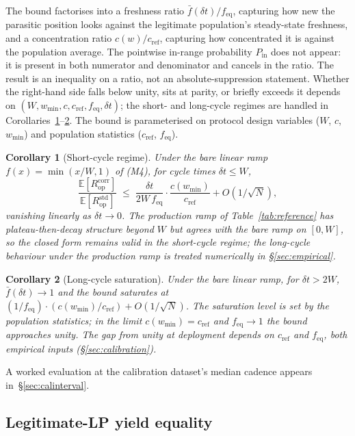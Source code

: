 \documentclass[11pt,a4paper]{article}
\theoremstyle{definition}
\theoremstyle{plain}
\newtheorem{corollary}{Corollary}
\theoremstyle{remark}
\begin{document}
The bound factorises into a freshness ratio $\bar f(\delta t)/f_{\text{eq}}$, capturing how new the parasitic position looks against the legitimate population's steady-state freshness, and a concentration ratio $c(w)/c_{\text{ref}}$, capturing how concentrated it is against the population average. The pointwise in-range probability $P_{\text{in}}$ does not appear: it is present in both numerator and denominator and cancels in the ratio. The result is an inequality on a ratio, not an absolute-suppression statement. Whether the right-hand side falls below unity, sits at parity, or briefly exceeds it depends on $(W, w_{\min}, c, c_{\text{ref}}, f_{\text{eq}}, \delta t)$; the short- and long-cycle regimes are handled in Corollaries~\ref{cor:short}--\ref{cor:long}. The bound is parameterised on protocol design variables ($W$, $c$, $w_{\min}$) and population statistics ($c_{\text{ref}}$, $f_{\text{eq}}$).

\begin{corollary}[Short-cycle regime]\label{cor:short}
Under the bare linear ramp $f(x) = \min(x/W, 1)$ of (M4), for cycle times $\delta t \leq W$,
\[
\frac{\mathbb{E}[R^{\text{corr}}_{\text{op}}]}{\mathbb{E}[R^{\text{std}}_{\text{op}}]} \;\leq\; \frac{\delta t}{2W\,f_{\text{eq}}} \cdot \frac{c(w_{\min})}{c_{\text{ref}}} + O(1/\sqrt N),
\]
vanishing linearly as $\delta t \to 0$. The production ramp of Table~\ref{tab:reference} has plateau-then-decay structure beyond $W$ but agrees with the bare ramp on $[0, W]$, so the closed form remains valid in the short-cycle regime; the long-cycle behaviour under the production ramp is treated numerically in \S\ref{sec:empirical}.
\end{corollary}

\begin{corollary}[Long-cycle saturation]\label{cor:long}
Under the bare linear ramp, for $\delta t > 2W$, $\bar f(\delta t) \to 1$ and the bound saturates at $(1/f_{\text{eq}}) \cdot (c(w_{\min})/c_{\text{ref}}) + O(1/\sqrt N)$. The saturation level is set by the population statistics; in the limit $c(w_{\min}) = c_{\text{ref}}$ and $f_{\text{eq}} \to 1$ the bound approaches unity. The gap from unity at deployment depends on $c_{\text{ref}}$ and $f_{\text{eq}}$, both empirical inputs (\S\ref{sec:calibration}).
\end{corollary}

A worked evaluation at the calibration dataset's median cadence appears in~\S\ref{sec:calinterval}.

\subsection{Legitimate-LP yield equality}\label{sec:legit-thm}
\end{document}
